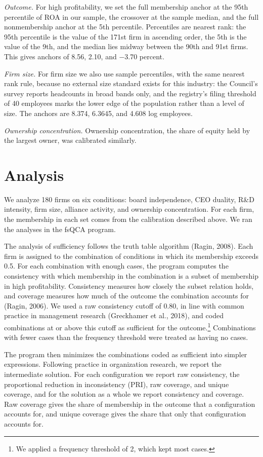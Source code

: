 \documentclass[11pt]{article}
\begin{document}
\noindent\emph{Outcome.} For high profitability, we set the full membership anchor at the 95th percentile of ROA in our sample, the crossover at the sample median, and the full nonmembership anchor at the 5th percentile. Percentiles are nearest rank: the 95th percentile is the value of the 171st firm in ascending order, the 5th is the value of the 9th, and the median lies midway between the 90th and 91st firms. This gives anchors of 8.56, 2.10, and $-$3.70 percent.

\medskip
\noindent\emph{Firm size.} For firm size we also use sample percentiles, with the same nearest rank rule, because no external size standard exists for this industry: the Council's survey reports headcounts in broad bands only, and the registry's filing threshold of 40 employees marks the lower edge of the population rather than a level of size. The anchors are 8.374, 6.3645, and 4.608 log employees.

\medskip
\noindent\emph{Ownership concentration.} Ownership concentration, the share of equity held by the largest owner, was calibrated similarly.

\clearpage
\section{Analysis}

We analyze 180 firms on six conditions: board independence, CEO duality, R\&D intensity, firm size, alliance activity, and ownership concentration. For each firm, the membership in each set comes from the calibration described above. We ran the analyses in the fsQCA program.

The analysis of sufficiency follows the truth table algorithm (Ragin, 2008). Each firm is assigned to the combination of conditions in which its membership exceeds 0.5. For each combination with enough cases, the program computes the consistency with which membership in the combination is a subset of membership in high profitability. Consistency measures how closely the subset relation holds, and coverage measures how much of the outcome the combination accounts for (Ragin, 2006). We used a raw consistency cutoff of 0.80, in line with common practice in management research (Greckhamer et al., 2018), and coded combinations at or above this cutoff as sufficient for the outcome.\footnote{We applied a frequency threshold of 2, which kept most cases.} Combinations with fewer cases than the frequency threshold were treated as having no cases.

The program then minimizes the combinations coded as sufficient into simpler expressions. Following practice in organization research, we report the intermediate solution. For each configuration we report raw consistency, the proportional reduction in inconsistency (PRI), raw coverage, and unique coverage, and for the solution as a whole we report consistency and coverage. Raw coverage gives the share of membership in the outcome that a configuration accounts for, and unique coverage gives the share that only that configuration accounts for.
\end{document}
